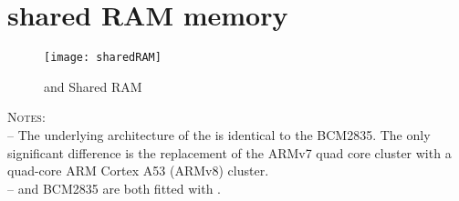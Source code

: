 
\chapter{\bcm{} shared RAM memory} %

\label{AppendixB} %

\begin{figure}[!htbp]
\centering
\texttt{[image: sharedRAM]}
\caption{\vc{} and \cpu{} Shared RAM}
\end{figure}

\textsc{Notes}:\\

-- The underlying architecture of the \bcm{} is identical to the BCM2835. The only significant difference is the replacement of the ARMv7 quad core cluster with a quad-core ARM Cortex A53 (ARMv8) cluster.\\

-- \bcm{} and BCM2835 are both fitted with \vc.

